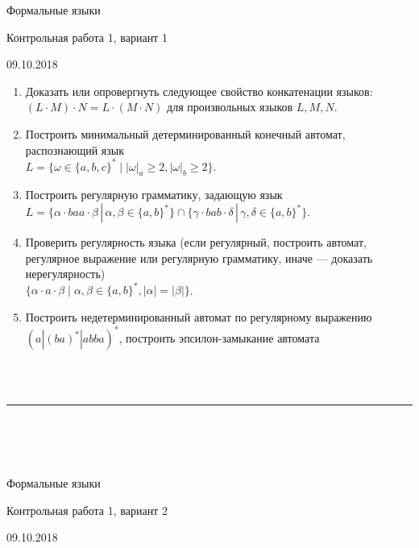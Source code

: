 \documentclass[12pt]{article}
\begin{document}
\begin{center} 
{\LARGE Формальные языки}

{\Large Контрольная работа 1, вариант 1}

{\large 09.10.2018}
\end{center}

\bigskip

\begin{enumerate}
  \item Доказать или опровергнуть следующее свойство конкатенации языков: $( L \cdot M ) \cdot N = L \cdot (M \cdot N) $ для произвольных языков $L, M, N$.
  \item Построить минимальный детерминированный конечный автомат, распознающий язык \\ $L = \{\omega \in \{ a, b, c \}^* \mid | \omega |_a \geq 2, | \omega |_b \geq 2 \}$.

  \item Построить регулярную грамматику, задающую язык \\ $ L = \{ \alpha \cdot baa \cdot \beta \, | \, \alpha, \beta \in \{ a, b \}^* \} \cap \{ \gamma \cdot bab \cdot \delta \, | \, \gamma, \delta \in \{ a, b \}^* \} $.
  \item Проверить регулярность языка (если регулярный, построить автомат, регулярное выражение или регулярную грамматику, иначе --- доказать нерегулярность) \\ $\{ \alpha \cdot a \cdot \beta \mid \alpha, \beta \in \{ a, b\}^*, |\alpha| = |\beta| \} $.
  \item {Построить недетерминированный автомат по регулярному выражению $ (a | (ba)^* | abba )^*  $, построить эпсилон-замыкание автомата }
\end{enumerate}

\bigskip

~\\~

\bigskip

\rule{\textwidth}{1pt}

\bigskip

~\\~\\~

\bigskip

\begin{center}
{\LARGE Формальные языки}

{\Large Контрольная работа 1, вариант 2}

{\large 09.10.2018}
\end{center}
\bigskip
\end{document}
